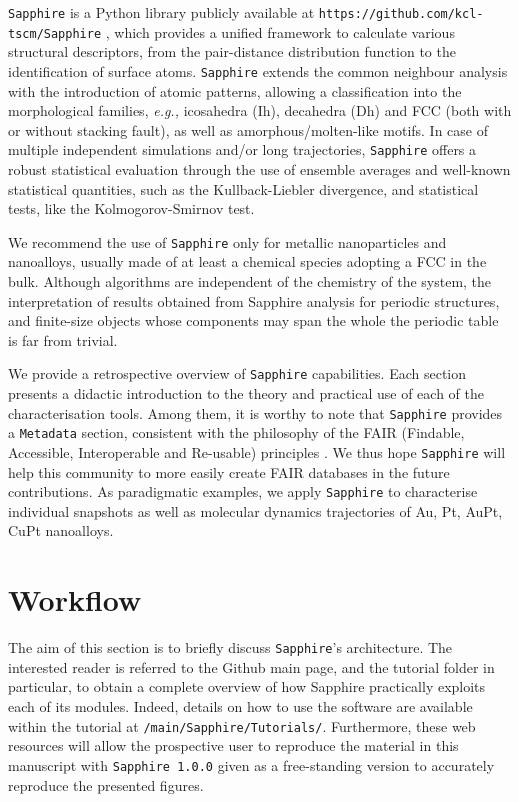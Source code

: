 \texttt{Sapphire} is a Python library publicly available at \texttt{https://github.com/kcl-tscm/Sapphire} \cite{Sapphire}, which provides a unified framework to calculate various structural descriptors, from the pair-distance distribution function to the identification of surface atoms. \texttt{Sapphire} extends the common neighbour analysis with the introduction of atomic patterns, allowing a classification into the morphological families, \textit{e.g.,} icosahedra (Ih), decahedra (Dh) and FCC (both with or without stacking fault), as well as amorphous/molten-like motifs. In case of multiple independent simulations and/or long trajectories, \texttt{Sapphire} offers  a robust statistical evaluation  through the use of ensemble averages and well-known statistical quantities, such as the Kullback-Liebler divergence, and statistical tests, like the Kolmogorov-Smirnov test. 

We recommend the use of \texttt{Sapphire} only for metallic nanoparticles and nanoalloys, usually made of at least a chemical species adopting a FCC in the bulk. Although algorithms are independent of the chemistry of the system, the interpretation of results  obtained from Sapphire analysis for periodic structures, and finite-size objects whose components may span the whole the periodic table is far from trivial.

We provide a retrospective overview of \texttt{Sapphire} capabilities. 
Each section presents a didactic introduction to the theory and practical use of each of the characterisation tools. 
Among them, it is worthy to note that \texttt{Sapphire} provides a \texttt{Metadata} section, consistent with the philosophy of the FAIR (Findable, Accessible, Interoperable and Re-usable) principles \cite{https://doi.org/10.48550/arxiv.1805.05039}. 
We thus hope \texttt{Sapphire} will help this community to  more easily create FAIR databases in the future contributions.
%
As paradigmatic examples, we apply \texttt{Sapphire} to characterise individual snapshots as well as molecular dynamics trajectories of Au, Pt, AuPt, CuPt nanoalloys.
%
 
\section{Workflow}
\label{sec:Workflow}

The aim of this section is to briefly discuss \texttt{Sapphire}'s architecture. 
The interested reader is referred to the Github main page, and the tutorial folder in particular, to obtain a complete overview of how Sapphire practically exploits each of its modules.
Indeed, details on how to use the software are available within the tutorial at \texttt{/main/Sapphire/Tutorials/}. 
Furthermore, these web resources will allow the prospective user to reproduce the material in this manuscript with \texttt{Sapphire 1.0.0} given as a free-standing version to accurately reproduce the presented figures.
%

